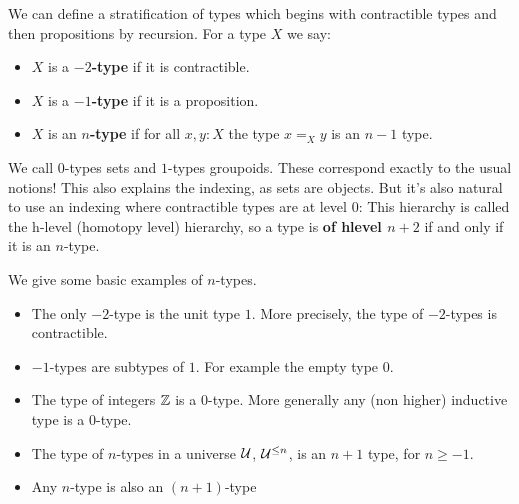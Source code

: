 \documentclass[10pt,oneside,leqno,openright]{memoir}
\begin{document}
\begin{definition}
    We can define a stratification of types which begins with contractible types and then propositions by recursion. For a type $X$ we say:
    \begin{itemize}
        \item $X$ is a \textbf{$-2$-type} if it is contractible.
        \item $X$ is a \textbf{$-1$-type} if it is a proposition.
        \item $X$ is an\textbf{ $n$-type} if for all $x, y : X$ the type $x=_Xy$ is an $n-1$ type.
    \end{itemize}
\end{definition}

\begin{remark}
    We call $0$-types sets and $1$-types groupoids. These correspond exactly to the usual notions!
    This also explains the indexing, as sets are  objects. But it's also natural to use an indexing where contractible types are at level $0$: This hierarchy is called the h-level (homotopy level) hierarchy, so a type is \textbf{of hlevel $n+2$} if and only if it is an $n$-type.
\end{remark}

\begin{example}
We give some basic examples of $n$-types.
\begin{itemize}
\item The only $-2$-type is the unit type $1$. More precisely, the type of
  $-2$-types is contractible.
    \item $-1$-types are subtypes of $1$. For example the empty type $0$.
    \item The type of integers $\mathbb{Z}$ is a $0$-type. More generally any (non higher) inductive type is a $0$-type.
    \item The type of $n$-types in a universe $\mathcal{U}$, $\mathcal{U}^{\le n}$, is an $n+1$ type, for $n\ge-1$.
    \item Any $n$-type is also an $(n+1)$-type
\end{itemize}
\end{example}
\end{document}
